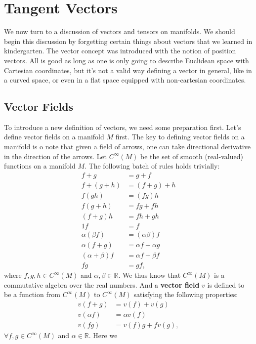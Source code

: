 \documentclass[a4paper,11pt]{article}
\theoremstyle{remark}
\begin{document}
\section{Tangent Vectors}
\label{s:VT}
We now turn to a discussion of vectors and tensors on manifolds. We
should begin this discussion by forgetting certain things about
vectors that we learned in kindergarten. The vector concept was
introduced with the notion of position vectors. All is good as long as
one is only going to describe Euclidean space with Cartesian
coordinates, but it's not a valid way defining a vector in general,
like in a curved space, or even in a flat space equipped with
non-cartesian coordinates.
\subsection{Vector Fields}
\label{sub:vefi}
To introduce a new definition of vectors, we need some preparation
first. Let's define vector fields on a manifold $M$ first. The key to
defining vector fields on a manifold is o note that given a field of
arrows, one can take directional derivative in the direction of the
arrows. Let $C^{\infty}(M)$ be the set of smooth (real-valued)
functions on a manifold $M$. The following batch of rules holds trivially:
\begin{align*}
  f +g &= g+f\\
  f+(g+h)&=(f+g)+h\\
  f(g h)&=(f g)h\\
  f(g+h)&=f g+f h\\
  (f+g)h&=f h+g h\\
  1 f &= f\\
  \alpha( \beta f) &= ( \alpha \beta ) f \\
  \alpha(f+g) &= \alpha f+ \alpha g \\
  ( \alpha + \beta )f &= \alpha f + \beta f \\
  f g &=g f,
\end{align*}
where $f, g, h \in C^{\infty}(M)$ and $\alpha, \beta \in \mathbb{R}$.
We thus know that $C^{\infty}(M)$ is a commutative algebra over the
real numbers. And a \textbf{vector field} $v$ is defined to be a
function from $C^{\infty}(M)$ to $C^{\infty}(M)$ satisfying the
following properties:
\begin{align*}
  v(f+g)&=v(f)+v(g)\\
  v(\alpha f)&=\alpha v(f)\\
  v(f g)&=v(f) g+f v(g),
\end{align*}
$\forall f, g \in C^{\infty}(M)$ and $\alpha \in \mathbb{R}$. Here we
\end{document}
